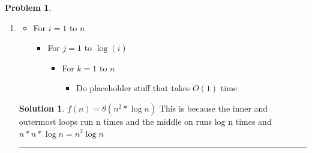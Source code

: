 \documentclass{article}
\theoremstyle{definition}
\newtheorem{problem}{Problem}
\def\fline{\rule{0.75\linewidth}{0.5pt}}
\newcommand{\finishline}{
  \begin{center}\fline
\end{center}}
\newtheorem*{solution*}{Solution}
\newenvironment{solution}{
\begin{solution*}}{{\finishline}
\end{solution*}}
\begin{document}
\begin{problem}
\begin{enumerate}[label =\alph*)]
      \item
        \begin{itemize}
          \item For $i = 1$ to $n$
            \begin{itemize}
              \item For $j = 1$ to $\log(i)$
                \begin{itemize}
                  \item For $k = 1$ to $n$
                    \begin{itemize}
                      \item Do placeholder stuff that takes $O(1)$ time
                    \end{itemize}
                \end{itemize}
            \end{itemize}
        \end{itemize}
        \begin{solution}
          $f(n) = \theta(n^2 * \log n)$ This is because the inner and outermost loops run n times and the middle on runs log n times and $n*n*\log n = n^2 \log n$
        \end{solution}

    \end{enumerate}

  \end{problem}
\end{document}

